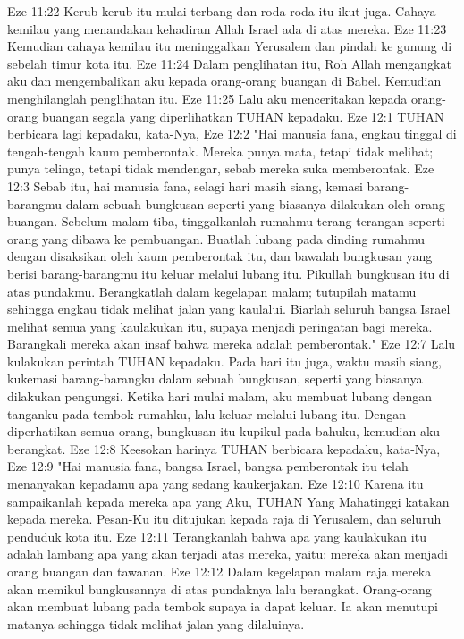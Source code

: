 Eze 11:22  Kerub-kerub itu mulai terbang dan roda-roda itu ikut juga. Cahaya kemilau yang menandakan kehadiran Allah Israel ada di atas mereka.
Eze 11:23  Kemudian cahaya kemilau itu meninggalkan Yerusalem dan pindah ke gunung di sebelah timur kota itu.
Eze 11:24  Dalam penglihatan itu, Roh Allah mengangkat aku dan mengembalikan aku kepada orang-orang buangan di Babel. Kemudian menghilanglah penglihatan itu.
Eze 11:25  Lalu aku menceritakan kepada orang-orang buangan segala yang diperlihatkan TUHAN kepadaku.
Eze 12:1  TUHAN berbicara lagi kepadaku, kata-Nya,
Eze 12:2  "Hai manusia fana, engkau tinggal di tengah-tengah kaum pemberontak. Mereka punya mata, tetapi tidak melihat; punya telinga, tetapi tidak mendengar, sebab mereka suka memberontak.
Eze 12:3  Sebab itu, hai manusia fana, selagi hari masih siang, kemasi barang-barangmu dalam sebuah bungkusan seperti yang biasanya dilakukan oleh orang buangan. Sebelum malam tiba, tinggalkanlah rumahmu terang-terangan seperti orang yang dibawa ke pembuangan. Buatlah lubang pada dinding rumahmu dengan disaksikan oleh kaum pemberontak itu, dan bawalah bungkusan yang berisi barang-barangmu itu keluar melalui lubang itu. Pikullah bungkusan itu di atas pundakmu. Berangkatlah dalam kegelapan malam; tutupilah matamu sehingga engkau tidak melihat jalan yang kaulalui. Biarlah seluruh bangsa Israel melihat semua yang kaulakukan itu, supaya menjadi peringatan bagi mereka. Barangkali mereka akan insaf bahwa mereka adalah pemberontak."
Eze 12:7  Lalu kulakukan perintah TUHAN kepadaku. Pada hari itu juga, waktu masih siang, kukemasi barang-barangku dalam sebuah bungkusan, seperti yang biasanya dilakukan pengungsi. Ketika hari mulai malam, aku membuat lubang dengan tanganku pada tembok rumahku, lalu keluar melalui lubang itu. Dengan diperhatikan semua orang, bungkusan itu kupikul pada bahuku, kemudian aku berangkat.
Eze 12:8  Keesokan harinya TUHAN berbicara kepadaku, kata-Nya,
Eze 12:9  "Hai manusia fana, bangsa Israel, bangsa pemberontak itu telah menanyakan kepadamu apa yang sedang kaukerjakan.
Eze 12:10  Karena itu sampaikanlah kepada mereka apa yang Aku, TUHAN Yang Mahatinggi katakan kepada mereka. Pesan-Ku itu ditujukan kepada raja di Yerusalem, dan seluruh penduduk kota itu.
Eze 12:11  Terangkanlah bahwa apa yang kaulakukan itu adalah lambang apa yang akan terjadi atas mereka, yaitu: mereka akan menjadi orang buangan dan tawanan.
Eze 12:12  Dalam kegelapan malam raja mereka akan memikul bungkusannya di atas pundaknya lalu berangkat. Orang-orang akan membuat lubang pada tembok supaya ia dapat keluar. Ia akan menutupi matanya sehingga tidak melihat jalan yang dilaluinya.

